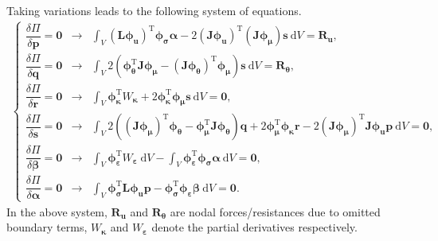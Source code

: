 \documentclass[3p,sort&compress,11pt,fleqn]{elsarticle}
\newcommand*{\mT}{\mathrm{T}}
\newcommand*{\md}[1]{\mathrm{d}#1}
\begin{document}
Taking variations leads to the following system of equations.
\begin{gather}\label{eq:stationary}
\left\{
\begin{array}{lll}
\dfrac{\delta\varPi}{\delta{}\mathbold{p}}=\mathbold{0}&\longrightarrow&\displaystyle\int_V\left(\mathbold{L}\mathbold{\phi}_\mathbold{u}\right)^\mT\mathbold{\phi}_\mathbold{\sigma}\mathbold{\alpha}-2\left(\mathbold{J}\mathbold{\phi}_\mathbold{u}\right)^\mT\left(\mathbold{J}\mathbold{\phi}_\mathbold{\mu}\right)\mathbold{s}~\md{V}=\mathbold{R}_\mathbold{u},\\[4mm]
\dfrac{\delta\varPi}{\delta{}\mathbold{q}}=\mathbold{0}&\longrightarrow&\displaystyle\int_V2\left(\mathbold{\phi}_\mathbold{\theta}^\mT\mathbold{J}\mathbold{\phi}_\mathbold{\mu}-\left(\mathbold{J}\mathbold{\phi}_\mathbold{\theta}\right)^\mT\mathbold{\phi}_\mathbold{\mu}\right)\mathbold{s}~\md{V}=\mathbold{R}_\mathbold{\theta},\\[4mm]
\dfrac{\delta\varPi}{\delta{}\mathbold{r}}=\mathbold{0}&\longrightarrow&\displaystyle\int_V\mathbold{\phi}_\mathbold{\kappa}^\mT{}W_\mathbold{\kappa}+2\mathbold{\phi}_\mathbold{\kappa}^\mT\mathbold{\phi}_\mathbold{\mu}\mathbold{s}~\md{V}=\mathbold{0},\\[4mm]
\dfrac{\delta\varPi}{\delta{}\mathbold{s}}=\mathbold{0}&\longrightarrow&\displaystyle
\int_V2\left(\left(\mathbold{J}\mathbold{\phi}_\mathbold{\mu}\right)^\mT\mathbold{\phi}_\mathbold{\theta}-\mathbold{\phi}_\mathbold{\mu}^\mT\mathbold{J}\mathbold{\phi}_\mathbold{\theta}\right)\mathbold{q}+2\mathbold{\phi}_\mathbold{\mu}^\mT\mathbold{\phi}_\mathbold{\kappa}\mathbold{r}-2\left(\mathbold{J}\mathbold{\phi}_\mathbold{\mu}\right)^\mT\mathbold{J}\mathbold{\phi}_\mathbold{u}\mathbold{p}~\md{V}=\mathbold{0},\\[4mm]
\dfrac{\delta\varPi}{\delta{}\mathbold{\beta}}=\mathbold{0}&\longrightarrow&\displaystyle\int_V\mathbold{\phi}_\mathbold{\varepsilon}^\mT{}W_{\mathbold{\varepsilon}}~\md{V}
-\int_V\mathbold{\phi}_\mathbold{\varepsilon}^\mT\mathbold{\phi}_\mathbold{\sigma}\mathbold{\alpha}~\md{V}=\mathbold{0},\\[4mm]
\dfrac{\delta\varPi}{\delta{}\mathbold{\alpha}}=\mathbold{0}&\longrightarrow&\displaystyle\int_V\mathbold{\phi}_\mathbold{\sigma}^\mT\mathbold{L}\mathbold{\phi}_\mathbold{u}\mathbold{p}-\mathbold{\phi}_\mathbold{\sigma}^\mT\mathbold{\phi}_\mathbold{\varepsilon}\mathbold{\beta}~\md{V}=\mathbold{0}.
\end{array}
\right.
\end{gather}
In the above system, $\mathbold{R}_\mathbold{u}$ and $\mathbold{R}_\mathbold{\theta}$ are nodal forces/resistances due to omitted boundary terms, $W_\mathbold{\kappa}$ and $W_\mathbold{\varepsilon}$ denote the partial derivatives respectively.
\end{document}
